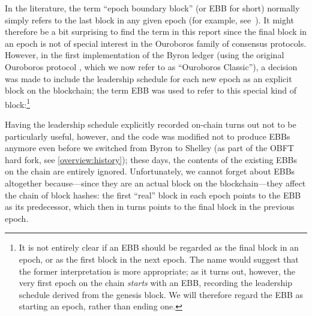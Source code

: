 In the literature, the term ``epoch boundary block'' (or EBB for short) normally
simply refers to the last block in any given epoch (for example,
see~\cite{buterin2020combining}). It might therefore be a bit surprising to find
the term in this report since the final block in an epoch is not of special
interest in the Ouroboros family of consensus protocols. However, in the first
implementation of the Byron ledger (using the original Ouroboros protocol
\cite{cryptoeprint:2016:889}, which we now refer to as ``Ouroboros Classic''), a
decision was made to include the leadership schedule for each new epoch as an
explicit block on the blockchain; the term EBB was used to refer to this special
kind of block:\footnote{It is not entirely clear if an EBB should be regarded as
the final block in an epoch, or as the first block in the next epoch. The name
would suggest that the former interpretation is more appropriate; as it turns
out, however, the very first epoch on the chain \emph{starts} with an EBB,
recording the leadership schedule derived from the genesis block. We will
therefore regard the EBB as starting an epoch, rather than ending one.}
%
\begin{center}
\end{center}

Having the leadership schedule explicitly recorded on-chain turns out not to
be particularly useful, however, and the code was modified not to produce EBBs
anymore even before we switched from Byron to Shelley (as part of the OBFT hard
fork, see \cref{overview:history}); these days, the contents of the existing
EBBs on the chain are entirely ignored. Unfortunately, we cannot forget about
EBBs altogether because---since they are an actual block on the
blockchain---they affect the chain of block hashes: the first ``real'' block in
each epoch points to the EBB as its predecessor, which then in turns points to
the final block in the previous epoch.

